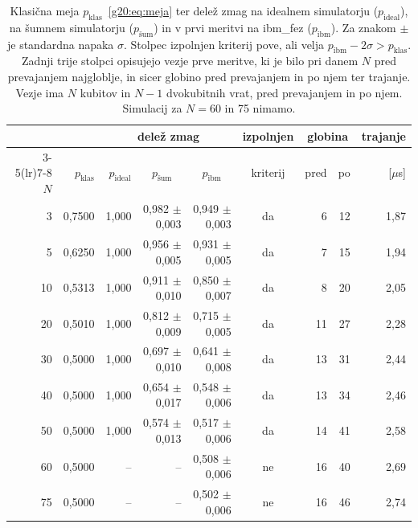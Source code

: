 \begin{table}[htbp]
\caption{Klasična meja $p_\text{klas}$~\eqref{g20:eq:meja} ter delež zmag na idealnem simulatorju ($p_\text{ideal}$), na šumnem simulatorju ($p_\text{šum}$) in v prvi meritvi na ibm\_fez ($p_\text{ibm}$). Za znakom $\pm$ je standardna napaka $\sigma$. Stolpec izpolnjen kriterij pove, ali velja $p_\text{ibm}-2\sigma>p_\text{klas}$. Zadnji trije stolpci opisujejo vezje prve meritve, ki je bilo pri danem $N$ pred prevajanjem najgloblje, in sicer globino pred prevajanjem in po njem ter trajanje. Vezje ima $N$ kubitov in $N-1$ dvokubitnih vrat, pred prevajanjem in po njem. Simulacij za $N=60$ in 75 nimamo.}
\label{g20:tab:igra}
\centering
\small
\setlength{\tabcolsep}{5pt}
\begin{tabular}{rrrrrcrrr}
\toprule
& & \multicolumn{3}{c}{delež zmag} & izpolnjen & \multicolumn{2}{c}{globina} & trajanje \\
\cmidrule(lr){3-5}\cmidrule(lr){7-8}
$N$ & $p_\text{klas}$ & $p_\text{ideal}$ & \multicolumn{1}{c}{$p_\text{šum}$} & \multicolumn{1}{c}{$p_\text{ibm}$} & kriterij & pred & po & [$\mu$s] \\
\midrule
3 & 0,7500 & 1,000 & 0,982 $\pm$ 0,003 & 0,949 $\pm$ 0,003 & da & 6 & 12 & 1,87 \\
5 & 0,6250 & 1,000 & 0,956 $\pm$ 0,005 & 0,931 $\pm$ 0,005 & da & 7 & 15 & 1,94 \\
10 & 0,5313 & 1,000 & 0,911 $\pm$ 0,010 & 0,850 $\pm$ 0,007 & da & 8 & 20 & 2,05 \\
20 & 0,5010 & 1,000 & 0,812 $\pm$ 0,009 & 0,715 $\pm$ 0,005 & da & 11 & 27 & 2,28 \\
30 & 0,5000 & 1,000 & 0,697 $\pm$ 0,010 & 0,641 $\pm$ 0,008 & da & 13 & 31 & 2,44 \\
40 & 0,5000 & 1,000 & 0,654 $\pm$ 0,017 & 0,548 $\pm$ 0,006 & da & 13 & 34 & 2,46 \\
50 & 0,5000 & 1,000 & 0,574 $\pm$ 0,013 & 0,517 $\pm$ 0,006 & da & 14 & 41 & 2,58 \\
60 & 0,5000 & -- & -- & 0,508 $\pm$ 0,006 & ne & 16 & 40 & 2,69 \\
75 & 0,5000 & -- & -- & 0,502 $\pm$ 0,006 & ne & 16 & 46 & 2,74 \\
\bottomrule
\end{tabular}
\end{table}

